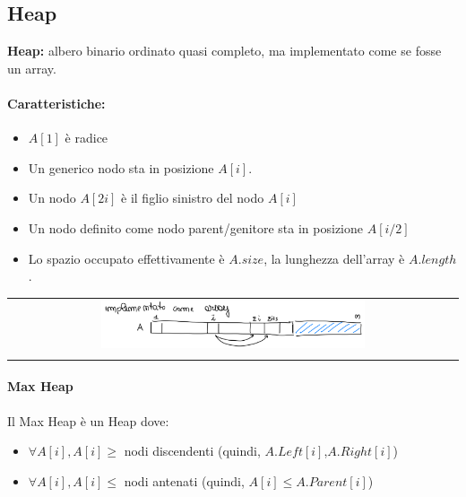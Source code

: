 \subsection{Heap}
\begin{mdframed}
    \textbf{Heap:} albero binario ordinato quasi completo, ma implementato come se fosse un array.
\end{mdframed}
\paragraph{Caratteristiche:}
\begin{itemize}
    \item $A[1]$ è radice
    \item Un generico nodo sta in posizione $A[i]$.
    \item Un nodo $A[2i]$ è il figlio sinistro del nodo $A[i]$
    \item Un nodo definito come nodo parent/genitore sta in posizione $A[i/2]$
    \item Lo spazio occupato effettivamente è $A.size$, la lunghezza dell'array è $A.length$.
\end{itemize}

\begin{center}
    \begin{tabular}{c}
        \\ \includegraphics[width=0.6\textwidth]{image/Heap.png} \\ \\
    \end{tabular}
\end{center}

\paragraph{Max Heap}
Il Max Heap è un Heap dove:
\begin{itemize}
    \item $\forall A[i], A[i] \geq$ nodi discendenti (quindi, $A.Left[i]$,$A.Right[i]$)
    \item $\forall A[i], A[i] \leq$ nodi antenati (quindi, $A[i] \leq A.Parent[i]$)
\end{itemize}

